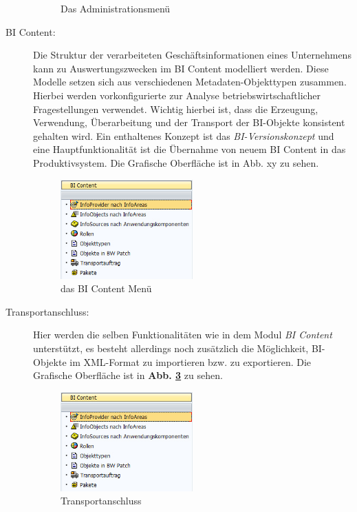 \begin{description}
\begin{figure}[H]
    \caption{Das Administrationsmenü}
    \label{pic:DWOverview}
\end{figure}
\item[BI Content:] Die Struktur der verarbeiteten Geschäftsinformationen eines Unternehmens kann zu Auswertungszwecken im BI Content modelliert werden. Diese Modelle setzen sich aus verschiedenen Metadaten-Objekttypen zusammen. Hierbei werden vorkonfigurierte zur Analyse betriebswirtschaftlicher Fragestellungen verwendet. Wichtig hierbei ist, dass die Erzeugung, Verwendung, Überarbeitung und der Transport der BI-Objekte konsistent gehalten wird. Ein enthaltenes Konzept ist das \textit{BI-Versionskonzept} und eine Hauptfunktionalität ist die Übernahme von neuem BI Content in das Produktivsystem.
Die Grafische Oberfläche ist in Abb. xy zu sehen.
\begin{figure}[H]
    \centering
    \includegraphics[width=0.5\textwidth]{files/BIContent}
    \caption{das BI Content Menü}
    \label{pic:DWOverview}
\end{figure}
\item[Transportanschluss:] Hier werden die selben Funktionalitäten wie in dem Modul \textit{BI Content} unterstützt, es besteht allerdings noch zusätzlich die Möglichkeit, BI-Objekte im XML-Format zu importieren bzw. zu exportieren.
Die Grafische Oberfläche ist in \textbf{Abb. \ref{pic:transport}} zu sehen.
\begin{figure}[H]
    \centering
    \includegraphics[width=0.5\textwidth]{files/BIContent}
    \caption{Transportanschluss}
    \label{pic:transport}

\end{figure}
\end{description}
